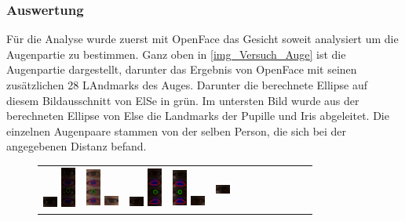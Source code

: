 \subsubsection{Auswertung}
Für die Analyse wurde zuerst mit OpenFace das Gesicht soweit analysiert um die Augenpartie zu bestimmen. Ganz oben in \autoref{img_Versuch_Auge} ist die Augenpartie dargestellt, darunter das Ergebnis von OpenFace mit seinen zusätzlichen 28 LAndmarks des Auges. Darunter die berechnete Ellipse auf diesem Bildausschnitt von ElSe in grün. Im untersten Bild wurde aus der berechneten Ellipse von Else die Landmarks der Pupille und Iris abgeleitet.
Die einzelnen Augenpaare stammen von der selben Person, die sich bei der angegebenen Distanz befand.
\begin{figure}
	\centering
	\begin{tabular}{|c|c|c|c|c|c|c|c|c|c|c|c|} 
		\hline 
		\includegraphics[width=0.48cm]{img_Versuch_Auge/Auge_1}
		\includegraphics[width=0.48cm]{img_Versuch_Auge/Auge_2}&
		\includegraphics[width=0.48cm]{img_Versuch_Auge/Auge_3}
		\includegraphics[width=0.48cm]{img_Versuch_Auge/Auge_4}&
		\includegraphics[width=0.48cm]{img_Versuch_Auge/Auge_5}
		\includegraphics[width=0.48cm]{img_Versuch_Auge/Auge_6}&
		\includegraphics[width=0.48cm]{img_Versuch_Auge/Auge_7}
		\includegraphics[width=0.48cm]{img_Versuch_Auge/Auge_8}&
		\includegraphics[width=0.48cm]{img_Versuch_Auge/Auge_9}

\end{tabular}
\end{figure}
